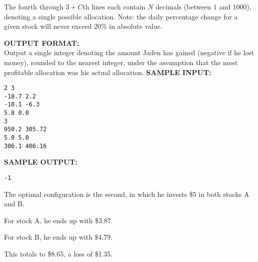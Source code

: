 \documentclass[twoside]{article}
\newcommand{\blank}{\vskip 3mm}
\begin{document}
The fourth through $3+C$th lines each contain $N$ decimals (between $1$ and $1000$), denoting a single possible allocation.
\blank
Note: the daily percentage change for a given stock will never exceed 20\% in absolute value.

\blank
\textbf{OUTPUT FORMAT:}\\
Output a single integer denoting the amount Jaden has gained (negative if he lost money), rounded to the nearest integer, under the assumption that the most profitable allocation was his actual allocation.
\blank
\textbf{SAMPLE INPUT:}
\begin{verbatim}
2 3
-18.7 2.2
-10.1 -6.3
5.8 0.0
3
950.2 305.72
5.0 5.0
306.1 406.16

\end{verbatim}
\textbf{SAMPLE OUTPUT:}
\begin{verbatim}
-1
\end{verbatim}
The optimal configuration is the second, in which he invests \$5 in both stocks A and B.

For stock A, he ends up with \$3.87.

For stock B, he ends up with \$4.79.

This totals to \$8.65, a loss of \$1.35.
\end{document}
